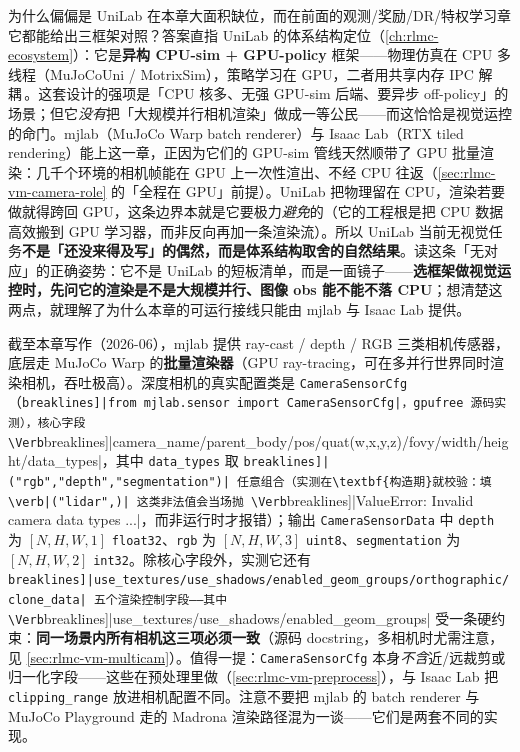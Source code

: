 \begin{insight}\label{ins:rlmc-vm-unilab-gap}
为什么偏偏是 UniLab 在本章大面积缺位，而在前面的观测/奖励/DR/特权学习章它都能给出三框架对照？答案直指 UniLab 的体系结构定位（\cref{ch:rlmc-ecosystem}）：它是\textbf{异构 CPU-sim + GPU-policy} 框架——物理仿真在 CPU 多线程（MuJoCoUni / MotrixSim），策略学习在 GPU，二者用共享内存 IPC 解耦\,\cite{unilab2026}。这套设计的强项是「CPU 核多、无强 GPU-sim 后端、要异步 off-policy」的场景；但它\emph{没有}把「大规模并行相机渲染」做成一等公民——而这恰恰是视觉运控的命门。mjlab（MuJoCo Warp batch renderer）与 Isaac Lab（RTX tiled rendering）能上这一章，正因为它们的 GPU-sim 管线天然顺带了 GPU 批量渲染：几千个环境的相机帧能在 GPU 上一次性渲出、不经 CPU 往返（\cref{sec:rlmc-vm-camera-role} 的「全程在 GPU」前提）。UniLab 把物理留在 CPU，渲染若要做就得跨回 GPU，这条边界本就是它要极力\emph{避免}的（它的工程根是把 CPU 数据高效搬到 GPU 学习器，而非反向再加一条渲染流）。所以 UniLab 当前无视觉任务\textbf{不是「还没来得及写」的偶然，而是体系结构取舍的自然结果}。读这条「无对应」的正确姿势：它不是 UniLab 的短板清单，而是一面镜子——\textbf{选框架做视觉运控时，先问它的渲染是不是大规模并行、图像 obs 能不能不落 CPU}；想清楚这两点，就理解了为什么本章的可运行接线只能由 mjlab 与 Isaac Lab 提供。
\end{insight}

\begin{note}
截至本章写作（2026-06），mjlab 提供 ray-cast / depth / RGB 三类相机传感器，底层走 MuJoCo Warp 的\textbf{批量渲染器}（GPU ray-tracing，可在多并行世界同时渲染相机，吞吐极高）。深度相机的真实配置类是 \texttt{CameraSensorCfg}（\Verb[breaklines]|from mjlab.sensor import CameraSensorCfg|，gpufree 源码实测），核心字段 \Verb[breaklines]|camera_name/parent_body/pos/quat(w,x,y,z)/fovy/width/height/data_types|，其中 \verb|data_types| 取 \Verb[breaklines]|("rgb","depth","segmentation")| 任意组合（实测在\textbf{构造期}就校验：填 \verb|("lidar",)| 这类非法值会当场抛 \Verb[breaklines]|ValueError: Invalid camera data types ...|，而非运行时才报错）；输出 \texttt{CameraSensorData} 中 \verb|depth| 为 $[N,H,W,1]$ \verb|float32|、\verb|rgb| 为 $[N,H,W,3]$ \verb|uint8|、\verb|segmentation| 为 $[N,H,W,2]$ \verb|int32|。除核心字段外，实测它还有 \Verb[breaklines]|use_textures/use_shadows/enabled_geom_groups/orthographic/clone_data| 五个渲染控制字段——其中 \Verb[breaklines]|use_textures/use_shadows/enabled_geom_groups| 受一条硬约束：\textbf{同一场景内所有相机这三项必须一致}（源码 docstring，多相机时尤需注意，见 \cref{sec:rlmc-vm-multicam}）。值得一提：\texttt{CameraSensorCfg} 本身\emph{不含}近/远裁剪或归一化字段——这些在预处理里做（\cref{sec:rlmc-vm-preprocess}），与 Isaac Lab 把 \texttt{clipping\_range} 放进相机配置不同。注意不要把 mjlab 的 batch renderer 与 MuJoCo Playground 走的 Madrona 渲染路径混为一谈——它们是两套不同的实现。
\end{note}

